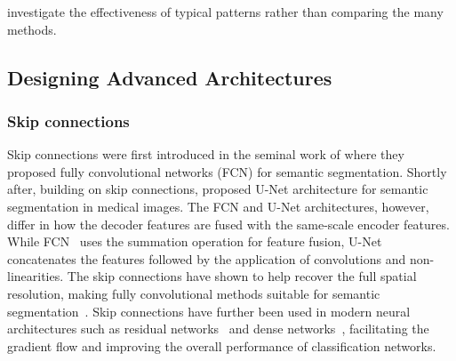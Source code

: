 investigate the effectiveness of typical patterns rather than comparing the many methods. 


\subsection{Designing Advanced Architectures}
\label{ch1:related_work:designing_advanced_architectures}


\subsubsection{Skip connections}
\label{ch1:related_work:designing_advanced_architectures:skip_connections}

Skip connections were first introduced in the seminal work of
\citet{long2015fully} where they proposed fully convolutional networks (FCN) for semantic segmentation. Shortly after, building on skip connections, \citet{ronneberger2015u} proposed U-Net architecture for semantic segmentation in medical images. The FCN and U-Net architectures, however, differ in how the decoder features are fused with the same-scale encoder features. While FCN~\citep{long2015fully} uses the summation operation for feature fusion,  U-Net~\citep{ronneberger2015u} concatenates the features followed by the application of convolutions and non-linearities. The skip connections have shown to help recover the full spatial resolution, making fully convolutional methods suitable for semantic segmentation~\citep{chaurasia2017linknet,lin2017refinenet,zhao2018icnet,tajbakhsh2020errornet}. 
Skip connections have further been used in modern neural architectures such as  residual networks~\citep{he2016deep,he2016identity} and dense networks~\citep{huang2017densely}, facilitating the gradient flow and improving the overall performance of classification networks.


